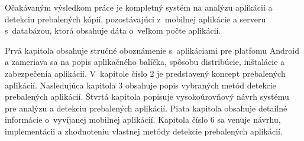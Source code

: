Očakávaným výsledkom práce je kompletný systém na analýzu aplikácií a detekciu prebalených kópií, pozostávajúci z~mobilnej aplikácie a serveru s~databázou, ktorá obsahuje dáta o~veľkom počte aplikácií.

Prvá kapitola obsahuje stručné oboznámenie s~aplikáciami pre platfomu Android a zameriava sa na popis aplikačného balíčka, spôsobu distribúcie, inštalácie a zabezpečenia aplikácií. V~kapitole číslo 2 je predstavený koncept prebalených aplikácií. Nasledujúca kapitola 3 obsahuje popis vybraných metód detekcie prebalených aplikácií. Štvrtá kapitola popisuje vysokoúrovňový návrh systému pre analýzu a detekciu prebalených aplikácií. Piata kapitola obsahuje detailné informácie o~vyvíjanej mobilnej aplikácií. Kapitola číslo 6 sa venuje návrhu, implementácii a zhodnoteniu vlastnej metódy detekcie prebalených aplikácií. 
